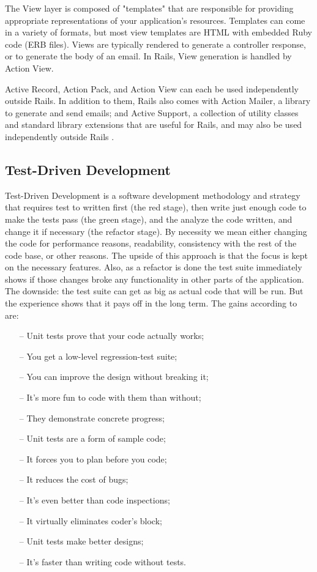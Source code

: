 The View layer is composed of "templates" that are responsible for providing
appropriate representations of your application's resources. Templates can come
in a variety of formats, but most view templates are HTML with embedded Ruby
code (ERB files). Views are typically rendered to generate a controller
response, or to generate the body of an email. In Rails, View generation is
handled by Action View.

Active Record, Action Pack, and Action View can each be used independently
outside Rails. In addition to them, Rails also comes with Action Mailer, a
library to generate and send emails; and Active Support, a
collection of utility classes and standard library extensions that are useful
for Rails, and may also be used independently outside Rails \citep{rails_readme}.
\subsection{Test-Driven Development}
Test-Driven Development is a software development methodology and strategy that
requires test to written first (the red stage), then write just enough code to
make the tests pass (the green stage), and the analyze the code written, and
change it if necessary (the refactor stage). By necessity we mean either changing
the code for performance reasons, readability, consistency with the rest of the
code base, or other reasons. The upside of this approach is that
the focus is kept on the necessary features. Also, as a refactor is done the
test suite immediately shows if those changes broke any functionality in other
parts of the application.  The downside: the test suite can get as big as actual
code that will be run. But the experience shows that it pays off in the long
term. The gains according to \citep{twelveBenefitsOfUnitTests} are:
\begin{enumerate}[topsep=5pt, partopsep=0pt,itemsep=3pt,parsep=1pt]
    \item[--] Unit tests prove that your code actually works;
    \item[--] You get a low-level regression-test suite;
    \item[--] You can improve the design without breaking it;
    \item[--] It's more fun to code with them than without;
    \item[--] They demonstrate concrete progress;
    \item[--] Unit tests are a form of sample code;
    \item[--] It forces you to plan before you code;
    \item[--] It reduces the cost of bugs;
    \item[--] It's even better than code inspections;
    \item[--] It virtually eliminates coder's block;
    \item[--] Unit tests make better designs;
    \item[--] It's faster than writing code without tests.
\end{enumerate}

